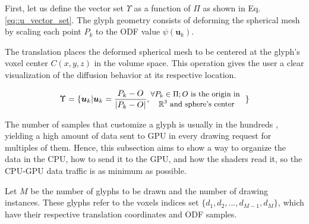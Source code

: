 \documentclass[twoside,twocolumn,10pt]{article}
\begin{document}
First, let us define the vector set $\Upsilon$ as a function of $\Pi$ as shown in Eq. \ref{eq::u_vector_set}. The glyph geometry consists of deforming the spherical mesh by scaling each point $P_k$ to the ODF value $\psi(\bm{u}_k)$.

The translation places the deformed spherical mesh to be centered at the glyph's voxel center $C(x, y, z)$ in the volume space. This operation gives the user a clear visualization of the diffusion behavior at its respective location.

\begin{equation}
\label{eq::u_vector_set}
\Upsilon = \{\bm{u}_k | \bm{u}_k = \frac{P_k - O}{|P_k - O|}, 
\begin{tabular}{@{}c@{}}
\small{$\forall P_k \in \Pi; O$ is the origin in } \\
\small{$\mathbb{R}^3$ and sphere's center}



\end{tabular}
\text{ }\}
\end{equation}


The number of samples that customize a glyph is usually in the hundreds \cite{TuchQBall2004, yeh2010}, yielding a high amount of data sent to GPU in every drawing request for multiples of them. Hence, this subsection aims to show a way to organize the data in the CPU, how to send it to the GPU, and how the shaders read it, so the CPU-GPU data traffic is as minimum as possible. 


Let $M$ be the number of glyphs to be drawn and the number of drawing instances. These glyphs refer to the voxels indices set $\{d_1, d_2, ..., d_{M-1}, d_M\}$, which have their respective translation coordinates and ODF samples.




\end{document}
